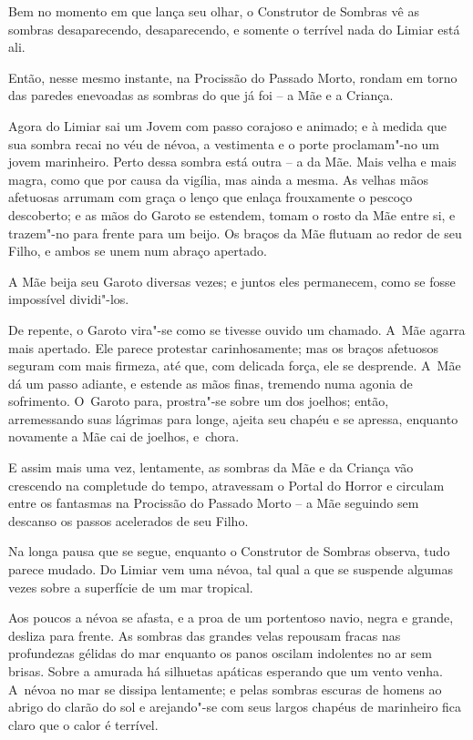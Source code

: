 Bem no momento em que lança seu olhar, o Construtor de Sombras vê as
sombras desaparecendo, desaparecendo, e somente o terrível nada do
Limiar está ali.

Então, nesse mesmo instante, na Procissão do Passado Morto, rondam em
torno das paredes enevoadas as sombras do que já foi -- a Mãe e a
Criança.

\smallskip
Agora do Limiar sai um Jovem com passo corajoso e animado; e à medida
que sua sombra recai no véu de névoa, a vestimenta e o porte
proclamam"-no um jovem marinheiro. Perto dessa sombra está outra -- a da
Mãe. Mais velha e mais magra, como que por causa da vigília, mas ainda a
mesma. As velhas mãos afetuosas arrumam com graça o lenço que enlaça
frouxamente o pescoço descoberto; e as mãos do Garoto se estendem, tomam o
rosto da Mãe entre si, e trazem"-no para frente para um beijo. Os braços
da Mãe flutuam ao redor de seu Filho, e ambos se unem num abraço
apertado.

A Mãe beija seu Garoto diversas vezes; e juntos eles permanecem, como se
fosse impossível dividi"-los.

De repente, o Garoto vira"-se como se tivesse ouvido um chamado. A~Mãe
agarra mais apertado. Ele parece protestar carinhosamente; mas os braços
afetuosos seguram com mais firmeza, até que, com delicada força, ele se
desprende. A~Mãe dá um passo adiante, e estende as mãos finas, tremendo
numa agonia de sofrimento. O~Garoto para, prostra"-se sobre um dos
joelhos; então, arremessando suas lágrimas para longe, ajeita seu chapéu
e se apressa, enquanto novamente a Mãe cai de joelhos, e~chora.

E assim mais uma vez, lentamente, as sombras da Mãe e da Criança vão
crescendo na completude do tempo, atravessam o Portal do Horror e
circulam entre os fantasmas na Procissão do Passado Morto -- a Mãe
seguindo sem descanso os passos acelerados de seu Filho.

\smallskip
Na longa pausa que se segue, enquanto o Construtor de Sombras observa,
tudo parece mudado. Do Limiar vem uma névoa, tal qual a que se suspende
algumas vezes sobre a superfície de um mar tropical.

Aos poucos a névoa se afasta, e a proa de um portentoso navio, negra e
grande, desliza para frente. As sombras das grandes velas repousam
fracas nas profundezas gélidas do mar enquanto os panos oscilam
indolentes no ar sem brisas. Sobre a amurada há silhuetas apáticas
esperando que um vento venha. A~névoa no mar se dissipa lentamente; e
pelas sombras escuras de homens ao abrigo do clarão do sol e arejando"-se
com seus largos chapéus de marinheiro fica claro que o calor é terrível.


